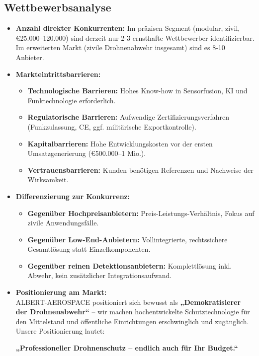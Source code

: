 \documentclass[11pt,a4paper]{article}
\begin{document}
\subsection{Wettbewerbsanalyse}
\begin{itemize}
    \item \textbf{Anzahl direkter Konkurrenten:} Im präzisen Segment (modular, zivil, €25.000–120.000) sind derzeit nur 2-3 ernsthafte Wettbewerber identifizierbar. Im erweiterten Markt (zivile Drohnenabwehr insgesamt) sind es 8-10 Anbieter.
    
    \item \textbf{Markteintrittsbarrieren:}
    \begin{itemize}
        \item \textbf{Technologische Barrieren:} Hohes Know-how in Sensorfusion, KI und Funktechnologie erforderlich.
        \item \textbf{Regulatorische Barrieren:} Aufwendige Zertifizierungsverfahren (Funkzulassung, CE, ggf. militärische Exportkontrolle).
        \item \textbf{Kapitalbarrieren:} Hohe Entwicklungskosten vor der ersten Umsatzgenerierung (€500.000–1 Mio.).
        \item \textbf{Vertrauensbarrieren:} Kunden benötigen Referenzen und Nachweise der Wirksamkeit.
    \end{itemize}
    
    \item \textbf{Differenzierung zur Konkurrenz:}
    \begin{itemize}
        \item \textbf{Gegenüber Hochpreisanbietern:} Preis-Leistungs-Verhältnis, Fokus auf zivile Anwendungsfälle.
        \item \textbf{Gegenüber Low-End-Anbietern:} Vollintegrierte, rechtssichere Gesamtlösung statt Einzelkomponenten.
        \item \textbf{Gegenüber reinen Detektionsanbietern:} Komplettlösung inkl. Abwehr, kein zusätzlicher Integrationsaufwand.
    \end{itemize}
    
    \item \textbf{Positionierung am Markt:} \\
    ALBERT-AEROSPACE positioniert sich bewusst als \textbf{„Demokratisierer der Drohnenabwehr“} – wir machen hochentwickelte Schutztechnologie für den Mittelstand und öffentliche Einrichtungen erschwinglich und zugänglich. Unsere Positionierung lautet:
    
    \begin{center}
        \textbf{„Professioneller Drohnenschutz – endlich auch für Ihr Budget.“}
    \end{center}
\end{itemize}
\end{document}
